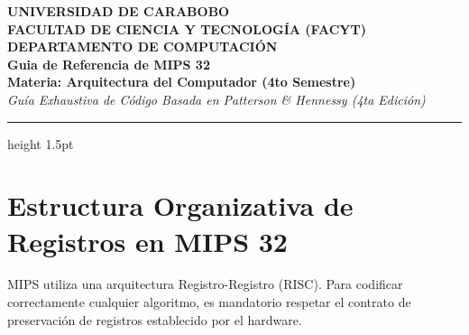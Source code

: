 \documentclass[11pt,letterpaper]{article}
\begin{document}
\begin{center}
    {\large \textbf{UNIVERSIDAD DE CARABOBO}} \\
    {\large \textbf{FACULTAD DE CIENCIA Y TECNOLOGÍA (FACYT)}} \\
    {\large \textbf{DEPARTAMENTO DE COMPUTACIÓN}} \\
    \vspace{0.8cm}
    {\huge \color{darkblue} \textbf{Guia de Referencia de MIPS 32}} \\
    \vspace{0.4cm}
    {\large \textbf{Materia: Arquitectura del Computador (4to Semestre)}} \\
    \vspace{0.2cm}
    \textit{Guía Exhaustiva de Código Basada en Patterson \& Hennessy (4ta Edición)}
    \vspace{0.6cm}
\end{center}

\hrule height 1.5pt
\vspace{0.6cm}

\section{Estructura Organizativa de Registros en MIPS 32}
MIPS utiliza una arquitectura Registro-Registro (RISC). Para codificar correctamente cualquier algoritmo, es mandatorio respetar el contrato de preservación de registros establecido por el hardware.
\end{document}
